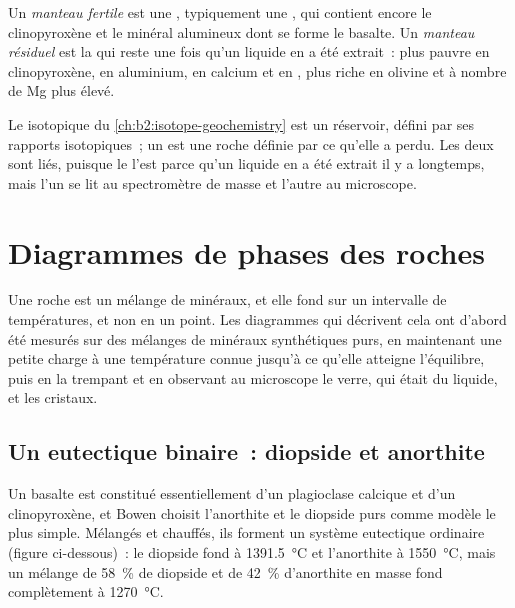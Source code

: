 \begin{definition}\label{def:b2:mantle-melting:fertility}
Un \emph{manteau fertile} est une , typiquement une
, qui contient encore le clinopyroxène et le minéral alumineux
dont se forme le basalte. Un \emph{manteau résiduel} est la
 qui reste une fois qu'un liquide en a été extrait~: plus pauvre en
clinopyroxène, en aluminium, en calcium et en , plus riche en
olivine et à nombre de Mg plus élevé.
\end{definition}

Le  isotopique du \cref{ch:b2:isotope-geochemistry} est un réservoir,
défini par ses rapports isotopiques~; un  est une roche définie par ce qu'elle a perdu.
Les deux sont liés, puisque le  l'est parce qu'un liquide en a été
extrait il y a longtemps, mais l'un se lit au spectromètre de masse et l'autre au
microscope.

\section{Diagrammes de phases des roches}\label{sec:b2:mantle-melting:diagrams}

Une roche est un mélange de minéraux, et elle fond sur un intervalle de températures, et non
en un point. Les diagrammes qui décrivent cela ont d'abord été mesurés sur des mélanges
de minéraux synthétiques purs, en maintenant une petite charge à une température connue jusqu'à
ce qu'elle atteigne l'équilibre, puis en la trempant et en observant au microscope le verre,
qui était du liquide, et les cristaux.

\subsection*{Un eutectique binaire~: diopside et anorthite}

Un basalte est constitué essentiellement d'un plagioclase calcique et d'un clinopyroxène, et
Bowen choisit l'anorthite et le diopside purs comme modèle le plus simple. Mélangés et chauffés,
ils forment un système eutectique ordinaire
(figure ci-dessous)~: le diopside fond à \qty{1391.5}{\celsius} et l'anorthite
à \qty{1550}{\celsius}, mais un mélange de \qty{58}{\percent} de diopside et
de \qty{42}{\percent} d'anorthite en masse fond complètement à \qty{1270}{\celsius}.

